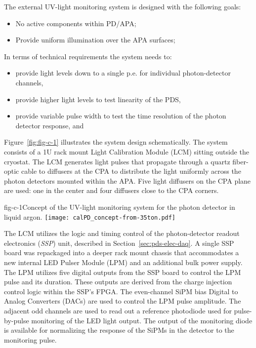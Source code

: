 The external UV-light monitoring system is designed with the following goals:
				
\begin{itemize}
\item No active components within PD/APA;
\item Provide uniform illumination over the APA surfaces;
\end{itemize}

In terms of technical requirements the system needs to:
\begin{itemize}
\item provide light levels down to a single p.e. for individual photon-detector channels,
\item provide higher light levels to test linearity of the PDS,
\item provide variable pulse width to test the time resolution of the photon detector response, and
\end{itemize}

Figure~\ref{fig:fig-c-1} illustrates the system design schematically. The system consists of a 1U rack mount Light Calibration Module (LCM) sitting outside the cryostat. The LCM generates light pulses that propagate through a quartz fiber-optic cable to diffusers at the CPA to distribute the light uniformly across the photon detectors mounted within the APA.  Five light 
diffusers on the CPA plane are used: one in the center and four diffusers close to the CPA corners. 
%
 \begin{cdrfigure}{fig-c-1}{Concept of the UV-light monitoring system for the photon detector in liquid argon.}
\texttt{[image: calPD\_concept-from-35ton.pdf]}
\end{cdrfigure}
%


The LCM utilizes the logic and timing control of the photon-detector readout electronics (\textit{SSP}) unit, described in Section~\ref{sec:pds-elec-daq}.  
A single SSP board was repackaged into a deeper rack mount chassis that accommodates a new internal 
LED Pulser Module (LPM) and an additional bulk power supply. The LPM utilizes five digital outputs from the SSP board to control the LPM pulse and its duration.  
These outputs are derived from the charge injection control logic within the SSP's FPGA.  
The even-channel SiPM bias Digital to Analog Converters (DACs)
are used to control the LPM pulse amplitude.  
The adjacent odd channels are used to read out a reference photodiode used for pulse-by-pulse monitoring of the LED light output.  
The output of the monitoring diode is available for normalizing 
the response of the SiPMs in the detector to the monitoring pulse.


